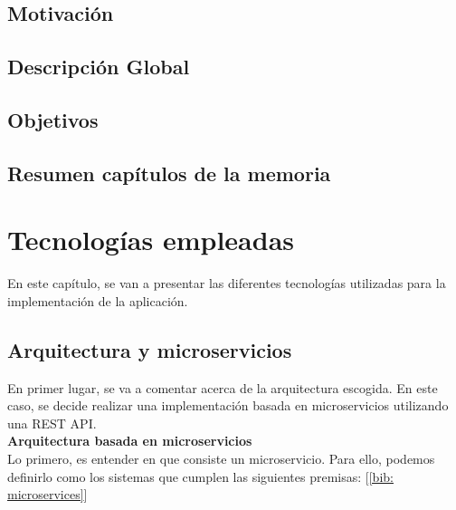 \documentclass[a4paper, oneside, 12pt]{book}
\begin{document}
	\section{Motivación}
	
	\section{Descripción Global}
	
	\section{Objetivos}
	
	\section{Resumen capítulos de la memoria}
	
	\pagebreak
	
	\chapter{Tecnologías empleadas}
	
	\noindent En este capítulo, se van a presentar las diferentes tecnologías utilizadas para la implementación de la aplicación.
	
	\section{Arquitectura y microservicios}
	
	\noindent En primer lugar, se va a comentar acerca de la arquitectura escogida. En este caso, se decide realizar una implementación basada en microservicios utilizando una REST API. \\
	
	
	\noindent \textbf{\large Arquitectura basada en \textbf{microservicios}} \\
	
	\noindent Lo primero, es entender en que consiste un microservicio. Para ello, podemos definirlo como los sistemas que cumplen las siguientes premisas: [\ref{bib: microservices}]
	
\end{document}
